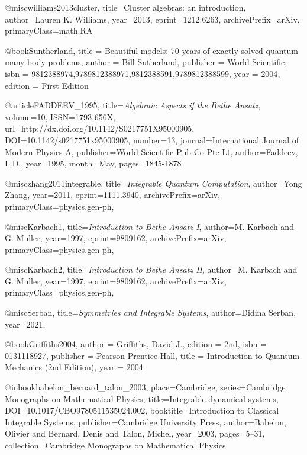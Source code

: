 @misc{williams2013cluster,
	title={Cluster algebras: an introduction}, 
	author={Lauren K. Williams},
	year={2013},
	eprint={1212.6263},
	archivePrefix={arXiv},
	primaryClass={math.RA}
}



@book{Suntherland,
	title =     {Beautiful models: 70 years of exactly solved quantum many-body problems},
	author =    {Bill Sutherland},
	publisher = {World Scientific},
	isbn =      {9812388974,9789812388971,9812388591,9789812388599},
	year =      {2004},
	edition =   {First Edition}
}


@article{FADDEEV_1995,
	title={\textit{Algebraic Aspects if the Bethe Ansatz}},
	volume={10},
	ISSN={1793-656X},
	url={http://dx.doi.org/10.1142/S0217751X95000905},
	DOI={10.1142/s0217751x95000905},
	number={13},
	journal={\textnormal{International Journal of Modern Physics A}},
	publisher={World Scientific Pub Co Pte Lt},
	author={Faddeev, L.D.},
	year={1995},
	month={May},
	pages={1845-1878}
}


@misc{zhang2011integrable,
	title={\textit{Integrable Quantum Computation}},
	author={Yong Zhang},
	year={2011},
	eprint={1111.3940},
	archivePrefix={arXiv},
	primaryClass={physics.gen-ph},
}


@misc{Karbach1,
	title={\textit{Introduction to Bethe Ansatz I}}, 
	author={M. Karbach and G. Muller},
	year={1997},
	eprint={9809162},
	archivePrefix={arXiv},
	primaryClass={physics.gen-ph},
}

@misc{Karbach2,
	title={\textit{Introduction to Bethe Ansatz II}}, 
	author={M. Karbach and G. Muller},
	year={1997},
	eprint={9809162},
	archivePrefix={arXiv},
	primaryClass={physics.gen-ph},
}

@misc{Serban,
	title={\textit{Symmetries and Integrable Systems}}, 
	author={Didina Serban},
	year={2021},
}

@book{Griffiths2004,
	author = {Griffiths, David J.},
	edition = {2nd},
	isbn = {0131118927},
	publisher = {Pearson Prentice Hall},
	title = {Introduction to Quantum Mechanics (2nd Edition)},
	year = 2004
}

@inbook{babelon_bernard_talon_2003, 
	place={Cambridge}, 
	series={Cambridge Monographs on Mathematical Physics}, 
	title={Integrable dynamical systems}, DOI={10.1017/CBO9780511535024.002}, booktitle={Introduction to Classical Integrable Systems}, publisher={Cambridge University Press}, author={Babelon, Olivier and Bernard, Denis and Talon, Michel}, year={2003}, pages={5–31}, collection={Cambridge Monographs on Mathematical Physics}
}

